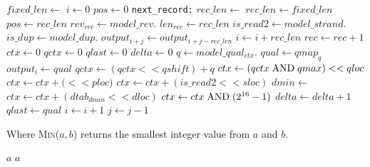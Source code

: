 \documentclass[a4paper]{article}
\begin{document}
\begin{algorithmic}[1]
    \State $fixed\_len \gets $
  \EndIf
  \Statex
  \State $i \gets 0$
  \State $pos \gets 0$
  \Label \texttt{next\_record:}
      \State $rec\_len \gets $
    \Else
      \State $rec\_len \gets fixed\_len$
    \EndIf
    \State $pos \gets rec\_len$
    \Statex
      \State $rev_{rec} \gets model\_rev.$
      \State $len_{rec} \gets rec\_len$
    \EndIf
      \State $is\_read2 \gets model\_strand.$
    \EndIf
    \Statex
      \State $is\_dup \gets model\_dup.$
          \State $output_{i+j} \gets output_{i+j-rec\_len}$
        \EndFor
        \State $i \gets i+rec\_len$
        \State $rec \gets rec+1$
        \State {}
      \EndIf
    \EndIf
    \Statex
    \State $ctx \gets 0$
    \State $qctx \gets 0$
    \State $qlast \gets 0$
    \State $delta \gets 0$
  \EndIf
  \Statex
  \State $q \gets model\_qual_{ctx}.$
  \State $qual \gets qmap_q$
  \State $output_i \gets qual$
  \Statex
  \State $qctx \gets (qctx << qshift) + q$
  \State $ctx \gets (qctx\bitand qmax) << qloc$
    \State $ctx \gets ctx + ($$ << ploc)$
  \EndIf
    \State $ctx \gets ctx + (is\_read2 << sloc)$
  \EndIf
    \State $dmin \gets$ 
    \State $ctx \gets ctx + (dtab_{dmin} << dloc)$
  \EndIf
  \State $ctx \gets ctx\bitand (2^{16}-1)$
  \Statex
    \State $delta \gets delta + 1$
  \EndIf
  \State $qlast \gets qual$
  \State $i \gets i + 1$
  \State $j \gets j - 1$
\EndWhile
{}
  \State {}
\EndIf
\EndProcedure
\end{algorithmic}

Where \textsc{Min}($a,b$) returns the smallest integer value from $a$ and $b$.

\begin{algorithmic}[1]
    \State \Return $a$
  \Else
    \State \Return $a$
  \EndIf
  \EndFunction
\end{algorithmic}
\end{document}
